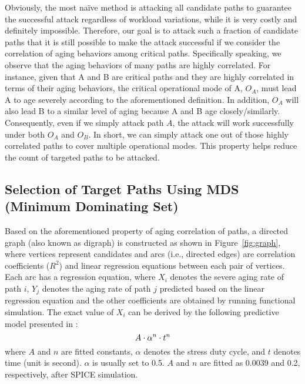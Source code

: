 Obviously, the most na\"ive method is attacking all candidate paths to guarantee the successful attack regardless of workload variations, while it is very costly and definitely impossible. 
Therefore, our goal is to attack such a fraction of candidate paths that it is still possible to make the attack successful if we consider the correlation of aging behaviors among critical paths. Specifically speaking, we observe that the aging behaviors of many paths are highly correlated. For instance, given that A and B are critical paths and they are highly correlated in terms of their aging behaviors, the critical operational mode of A, $O_{A}$, must lead A to age severely according to the aforementioned definition. In addition, $O_{A}$ will also lead B to a similar level of aging because A and B age closely/similarly. Consequently, even if we simply attack path $A$, the attack will work successfully under both $O_{A}$ and $O_{B}$. In short, we can simply attack one out of those highly correlated paths to cover multiple operational modes. This property helps reduce the count of targeted paths to be attacked.%

\subsection{Selection of Target Paths Using MDS (Minimum Dominating Set)}
\label{sec:frame:mds}
Based on the aforementioned property of aging correlation of paths, a directed graph (also known as digraph) is constructed as shown in Figure~\ref{fig:graph}, where vertices represent candidates and arcs (i.e., directed edges) are correlation coefficients ($R^2$) and linear regression equations between each pair of vertices. Each arc has a regression equation, where $X_{i}$ denotes the severe aging rate of path $i$, $Y_{j}$ denotes the aging rate of path $j$ predicted based on the linear regression equation and the other coefficients are obtained by running functional simulation. The exact value of $X_{i}$ can be derived by the following predictive model presented in \cite{wang2007efficient}:
\begin{equation}
	\fontsize{8}{8} \selectfont
	A \cdot \alpha^n \cdot t^n 
	\label{eq:worst}
\end{equation}
where $A$ and $n$ are fitted constants, $\alpha$ denotes the stress duty cycle, and $t$ denotes time (unit is second). $\alpha$ is usually set to 0.5. $A$ and $n$ are fitted as 0.0039 and 0.2, respectively, after SPICE simulation.


